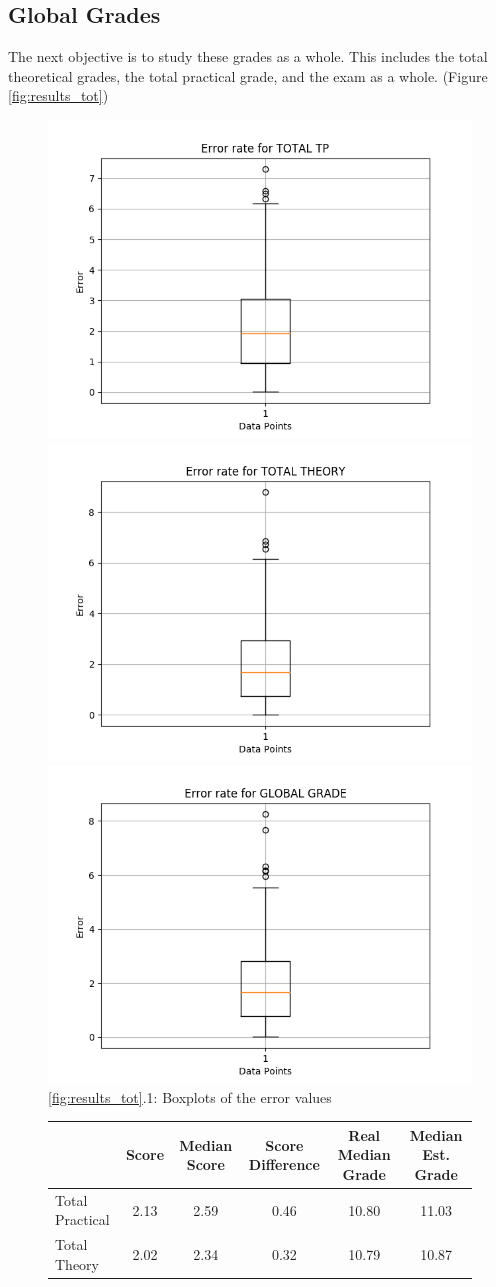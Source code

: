 \documentclass[a4paper,11pt]{report}
\numberwithin{figure}{chapter} %
\begin{document}
    \subsection{Global Grades}

    The next objective is to study these grades as a whole.
    This includes the total theoretical grades, the total practical grade, and the exam as a whole. (Figure \ref{fig:results_tot})


      \begin{figure}[H]
      \centering
      \includegraphics[width=.30\linewidth]{plots/cv_boxplot_TOTAL_TP_2018-04-27_19_24_46.png}
      \includegraphics[width=.30\linewidth]{plots/cv_boxplot_TOTAL_THEORY_2018-04-30_13_53_15.png}
      \includegraphics[width=.30\linewidth]{plots/cv_boxplot_GLOBAL_GRADE_2018-04-30_13_48_59.png}
      \\
      \ref{fig:results_tot}.1: Boxplots of the error values
      \\
      \vspace{0.5cm}
      \begin{tabular}{| l | c | c | c | c | c |}
      \hline
      & \tiny{Score} & \tiny{Median Score} & \tiny{Score Difference} & \tiny{Real Median Grade} & \tiny{Median Est.
      Grade}\\ \hline
      \tiny{Total Practical} & \tiny{2.13} & \tiny{2.59} & \tiny{0.46} & \tiny{10.80} & \tiny{11.03}\\ \hline
      \tiny{Total Theory} & \tiny{2.02} & \tiny{2.34} & \tiny{0.32} & \tiny{10.79} & \tiny{10.87}\\ \hline

\end{tabular}
\end{figure}
\end{document}
